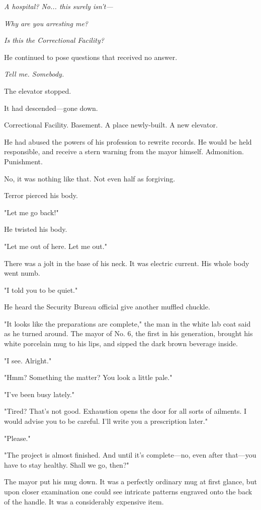 \emph{A hospital? No... this surely isn't---}

\emph{Why are you arresting me?}

\emph{Is this the Correctional Facility?}

He continued to pose questions that received no answer.

\emph{Tell me. Somebody.}

The elevator stopped.

It had descended---gone down.

Correctional Facility. Basement. A place newly-built. A new elevator.~

He had abused the powers of his profession to rewrite records. He would
be held responsible, and receive a stern warning from the mayor himself.
Admonition. Punishment.

No, it was nothing like that. Not even half as forgiving.

Terror pierced his body.

"Let me go back!"

He twisted his body.

"Let me out of here. Let me out."

There was a jolt in the base of his neck. It was electric current. His
whole body went numb.

"I told you to be quiet."

He heard the Security Bureau official give another muffled chuckle.

\myspace

"It looks like the preparations are complete," the man in the white lab
coat said as he turned around. The mayor of No. 6, the first in his
generation, brought his white porcelain mug to his lips, and sipped the
dark brown beverage inside.

"I see. Alright."

"Hmm? Something the matter? You look a little pale."

"I've been busy lately."

"Tired? That's not good. Exhaustion opens the door for all sorts of
ailments. I would advise you to be careful. I'll write you a
prescription later."

"Please."

"The project is almost finished. And until it's complete---no, even after
that---you have to stay healthy. Shall we go, then?"

The mayor put his mug down. It was a perfectly ordinary mug at first
glance, but upon closer examination one could see intricate patterns
engraved onto the back of the handle. It was a considerably expensive
item.

